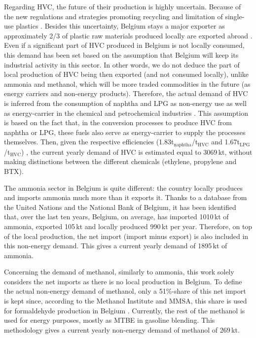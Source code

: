 Regarding \gls{HVC}, the future of their production is highly uncertain. Because of the new regulations and strategies promoting recycling and limitation of single-use plastics \cite{EU_plastics}.  Besides this uncertainty, Belgium stays a major exporter as approximately 2/3 of plastic raw materials produced locally are exported abroad \cite{agoria_plastics}. Even if a significant part of \gls{HVC} produced in Belgium is not locally consumed, this demand has been set based on the assumption that Belgium will keep its industrial activity in this sector. In other words, we do not deduce the part of local production of \gls{HVC} being then exported (and not consumed locally), unlike ammonia and methanol, which will be more traded commodities in the future (as energy carriers and non-energy products). Therefore, the actual demand of \gls{HVC} is inferred from the consumption of naphtha and \gls{LPG} as non-energy use as well as energy-carrier in the chemical and petrochemical industries \cite{statbel_NED_2019}. This assumption is based on the fact that, in the conversion processes to produce \gls{HVC} from naphtha or \gls{LPG}, these fuels also serve as energy-carrier to supply the processes themselves. Then, given the respective efficiencies (1.83t$_{\text{naphtha}}$/t$_{\text{HVC}}$ and 1.67t$_{\text{LPG}}$/t$_{\text{HVC}}$) \cite{IEA2018_petrochemicals}, the current yearly demand of \gls{HVC} is estimated equal to 3069\,kt, without making distinctions between the different chemicals (\ie ethylene, propylene and \gls{BTX}). 

The ammonia sector in Belgium is quite different: the country locally produces and imports ammonia much more than it exports it. Thanks to a database from the United Nations \cite{UN_statistics} and the National Bank of Belgium, it has been identified that, over the last ten years, Belgium, on average, has imported 1010\,kt of ammonia, exported 105\,kt and locally produced 990\,kt per year. Therefore, on top of the local production, the net import (\ie import minus export) is also included in this non-energy demand. This gives a current yearly demand of 1895\,kt of ammonia.

Concerning the demand of methanol, similarly to ammonia, this work solely considers the net imports as there is no local production in Belgium. To define the actual non-energy demand of methanol, only a 51\%-share of this net import is kept since, according to the Methanol Institute and \gls{MMSA}, this share is used for formaldehyde production in Belgium \cite{MMSA51}. Currently, the rest of the methanol is used for energy purposes, mostly as \gls{MTBE} in gasoline blending. This methodology gives a current yearly non-energy demand of methanol of 269\,kt.

